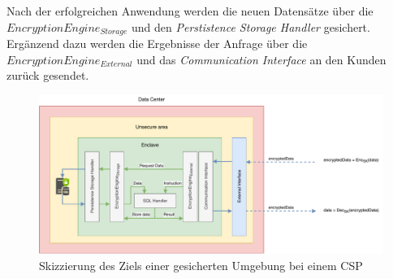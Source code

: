  
 Nach der erfolgreichen Anwendung werden die neuen Datensätze über die $EncryptionEngine_{Storage}$ und den \emph{Perstistence Storage Handler} gesichert. Ergänzend dazu werden die Ergebnisse der Anfrage über die $EncryptionEngine_{External}$ und das \emph{Communication Interface} an den Kunden zurück gesendet.
 
 
 \begin{figure}[h!]
 	\centering
 	\includegraphics[width=\textwidth]{img/enclave_details/enclave_details.pdf}
 	\caption{Skizzierung des Ziels einer gesicherten Umgebung bei einem \ac{CSP}}
 	\label{img:sgx-idea}
 \end{figure}